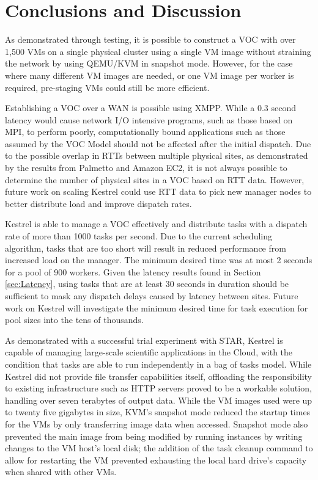 \chapter{Conclusions and Discussion}
\label{chap:Conclusions}
As demonstrated through testing,
it is possible to construct a VOC with over 1,500 VMs on a single
physical cluster using a single VM image without straining the network
by using QEMU/KVM in snapshot mode. However, for the case where many
different VM images are needed, or one VM image per worker is required,
pre-staging VMs could still be more efficient.

Establishing a VOC over a WAN is possible using XMPP. While a 0.3
second latency would cause network I/O intensive programs, such as
those based on MPI, to perform poorly, computationally bound applications
such as those assumed by the VOC Model should not be affected after
the initial dispatch. Due to the possible overlap in RTTs between
multiple physical sites, as demonstrated by the results from Palmetto
and Amazon EC2, it is not always possible to determine the number
of physical sites in a VOC based on RTT data. However, future work
on scaling Kestrel could use RTT data to pick new manager nodes to
better distribute load and improve dispatch rates.

Kestrel is able to manage a VOC effectively and distribute
tasks with a dispatch rate of more than 1000 tasks per second. Due
to the current scheduling algorithm, tasks that are too short will
result in reduced performance from increased load on the manager.
The minimum desired time was at most 2 seconds for a pool of 900 workers.
Given the latency results found in Section \ref{sec:Latency}, using
tasks that are at least 30 seconds in duration should be sufficient
to mask any dispatch delays caused by latency between sites. Future
work on Kestrel will investigate the minimum desired time for task
execution for pool sizes into the tens of thousands.

As demonstrated with a successful trial experiment with STAR, Kestrel
is capable of managing large-scale scientific applications in the
Cloud, with the condition that tasks are able to run independently
in a bag of tasks model. While Kestrel did not provide file transfer
capabilities itself, offloading the responsibility to existing infrastructure
such as HTTP servers proved to be a workable solution, handling over
seven terabytes of output data. While the VM images used were up to
twenty five gigabytes in size, KVM's snapshot mode reduced the startup
times for the VMs by only transferring image data when accessed. Snapshot
mode also prevented the main image from being modified by running
instances by writing changes to the VM host's local disk; the addition
of the task cleanup command to allow for restarting the VM prevented
exhausting the local hard drive's capacity when shared with other
VMs.
